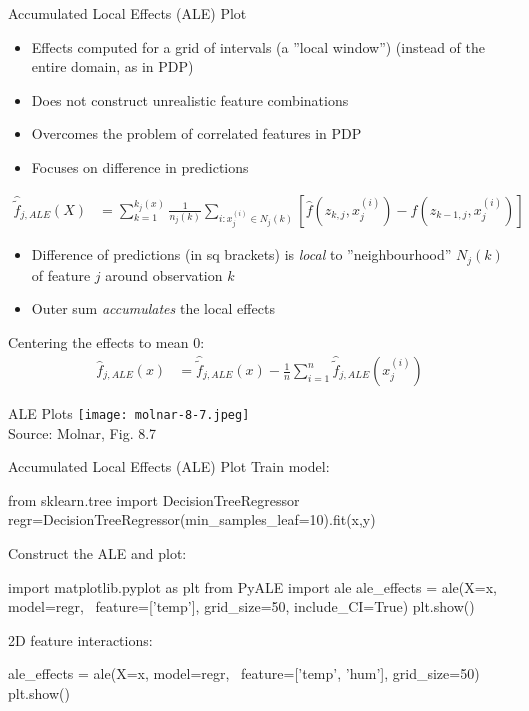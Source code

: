 \documentclass[ignorenonframetext,xcolor=x11names]{beamer}
\begin{document}
\begin{frame}[fragile]{Accumulated Local Effects (ALE) Plot}
\begin{itemize}
   \item Effects computed for a grid of intervals (a ''local window'') (instead of the entire domain, as in PDP)
   \item Does not construct unrealistic feature combinations
   \item Overcomes the problem  of correlated features in PDP
   \item Focuses on difference in predictions
\end{itemize}
\begin{align*}
\hat{\tilde{f}}_{j, ALE}(X) &= \sum_{k=1}^{k_j(x)} \frac{1}{n_j(k)} \sum_{i:x_j^{(i)} \in N_j(k)} \left[\hat{f}(z_{k, j}, x^{(i)}_j) - \hat{f} (z_{k-1, j},x^{(i)}_j) \right]
\end{align*}
\begin{itemize}
   \item Difference of predictions (in sq brackets) is \emph{local} to ''neighbourhood'' $N_j(k)$ of feature $j$ around observation $k$
   \item Outer sum \emph{accumulates} the local effects
\end{itemize}
Centering the effects to mean 0:
\begin{align*}
\hat{f}_{j, ALE}(x) &= \hat{\tilde{f}}_{j, ALE} (x) - \frac{1}{n} \sum_{i=1}^n \hat{\tilde{f}}_{j, ALE}(x_j^{(i)})
\end{align*}
\end{frame}

\begin{frame}{ALE Plots}
\centering
\texttt{[image: molnar-8-7.jpeg]} \\

\scriptsize Source: Molnar, Fig. 8.7
\end{frame}

\begin{frame}[fragile]{Accumulated Local Effects (ALE) Plot}
Train model:
\begin{pythoncode}
from sklearn.tree import DecisionTreeRegressor
regr=DecisionTreeRegressor(min_samples_leaf=10).fit(x,y)
\end{pythoncode}
Construct the ALE and plot:
\begin{pythoncode}
import matplotlib.pyplot as plt
from PyALE import ale
ale_effects = ale(X=x, model=regr, \
    feature=['temp'], grid_size=50, include_CI=True)
plt.show()
\end{pythoncode}
2D feature interactions:
\begin{pythoncode}
ale_effects = ale(X=x, model=regr, \
    feature=['temp', 'hum'], grid_size=50)
plt.show()
\end{pythoncode}
\end{frame}
\end{document}
